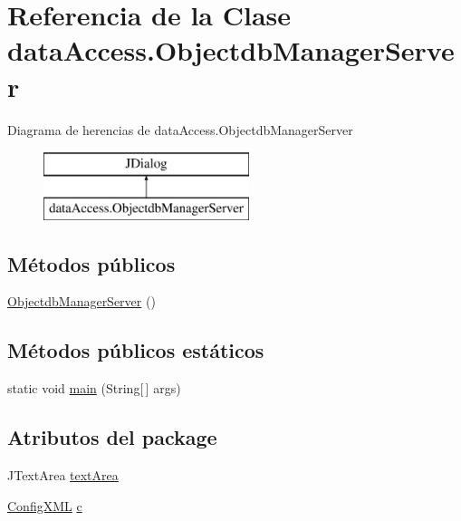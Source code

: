 \hypertarget{classdataAccess_1_1ObjectdbManagerServer}{}\section{Referencia de la Clase data\+Access.\+Objectdb\+Manager\+Server}
\label{classdataAccess_1_1ObjectdbManagerServer}
Diagrama de herencias de data\+Access.\+Objectdb\+Manager\+Server\begin{figure}[H]
\begin{center}
\leavevmode
\includegraphics[height=2.000000cm]{classdataAccess_1_1ObjectdbManagerServer}
\end{center}
\end{figure}
\subsection*{Métodos públicos}
\begin{DoxyCompactItemize}
\item 
\mbox{\hyperlink{classdataAccess_1_1ObjectdbManagerServer_a6aac62b0bbbebbb54d3105d5820c0061}{Objectdb\+Manager\+Server}} ()
\end{DoxyCompactItemize}
\subsection*{Métodos públicos estáticos}
\begin{DoxyCompactItemize}
\item 
static void \mbox{\hyperlink{classdataAccess_1_1ObjectdbManagerServer_a2e0f5eddf461be78de905ca56e4295f9}{main}} (String\mbox{[}$\,$\mbox{]} args)
\end{DoxyCompactItemize}
\subsection*{Atributos del \textquotesingle{}package\textquotesingle{}}
\begin{DoxyCompactItemize}
\item 
J\+Text\+Area \mbox{\hyperlink{classdataAccess_1_1ObjectdbManagerServer_ab739ebdf3a077579c9af7a881c620fd4}{text\+Area}}
\item 
\mbox{\hyperlink{classconfiguration_1_1ConfigXML}{Config\+X\+ML}} \mbox{\hyperlink{classdataAccess_1_1ObjectdbManagerServer_af08ecdac594a6dcaa286d9f52087d13f}{c}}
\end{DoxyCompactItemize}
